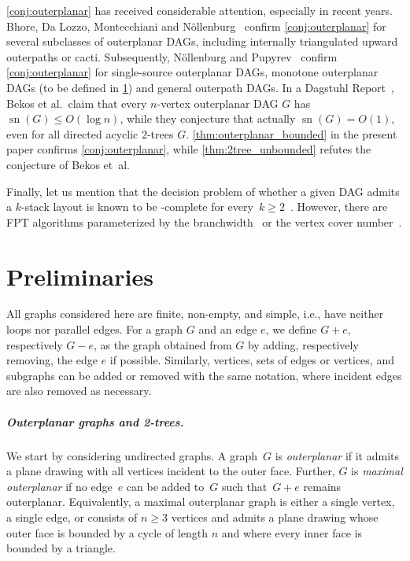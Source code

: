 \documentclass{theoretics}
\DeclareMathOperator{\sn}{sn}
\begin{document}
\cref{conj:outerplanar} has received considerable attention, especially in recent years.
Bhore, Da Lozzo, Montecchiani and N\"{o}llenburg~\cite{Bhore2021_UpwardBookThickness} confirm \cref{conj:outerplanar} for several subclasses of outerplanar DAGs, including internally triangulated upward outerpaths or cacti.
Subsequently, N\"{o}llenburg and Pupyrev~\cite{Noellenburg2021_DAGsWithConstantStackNumber} confirm \cref{conj:outerplanar} for single-source outerplanar DAGs, monotone outerplanar DAGs (to be defined in \cref{sec:preliminaries}) and general outerpath DAGs.  
In a Dagstuhl Report~\cite{Bekos2019_Planar_kPlanar}, Bekos et al.\ claim that every $n$-vertex outerplanar DAG $G$ has $\sn(G) \leq O(\log n)$, while they conjecture that actually $\sn(G) = O(1)$, even for all directed acyclic $2$-trees $G$.
\cref{thm:outerplanar_bounded} in the present paper confirms \cref{conj:outerplanar}, while \cref{thm:2tree_unbounded} refutes the conjecture of Bekos et~al.

Finally, let us mention that the decision problem of whether a given DAG admits a $k$-stack layout is known to be \NP-complete for every~$k \geq 2$~\cite{Bekos2022_DAGs2StacksNP,Binucci2019_UpwardStackST,Heath1999_DAGs2}.
However, there are FPT algorithms parameterized by the branchwidth~\cite{Binucci2019_UpwardStackST} or the vertex cover number~\cite{Bhore2021_UpwardBookThickness}.




\section{Preliminaries}
\label{sec:preliminaries}

All graphs considered here are finite, non-empty, and simple, i.e., have neither loops nor parallel edges.
For a graph $ G $ and an edge $ e $, we define $ G + e $, respectively $ G - e $, as the graph obtained from $ G $ by adding, respectively removing, the edge $ e $ if possible.
Similarly, vertices, sets of edges or vertices, and subgraphs can be added or removed with the same notation, where incident edges are also removed as necessary.


\subparagraph{Outerplanar graphs and 2-trees.}
We start by considering undirected graphs.
A graph~$G$ is \emph{outerplanar} if it admits a plane drawing with all vertices incident to the outer face.
Further, $G$ is \emph{maximal outerplanar} if no edge~$e$ can be added to~$G$ such that~$G + e$ remains outerplanar.
Equivalently, a maximal outerplanar graph is either a single vertex, a single edge, or consists of $n \geq 3$ vertices and admits a plane drawing whose outer face is bounded by a cycle of length $n$ and where every inner face is bounded by a triangle.
\end{document}
